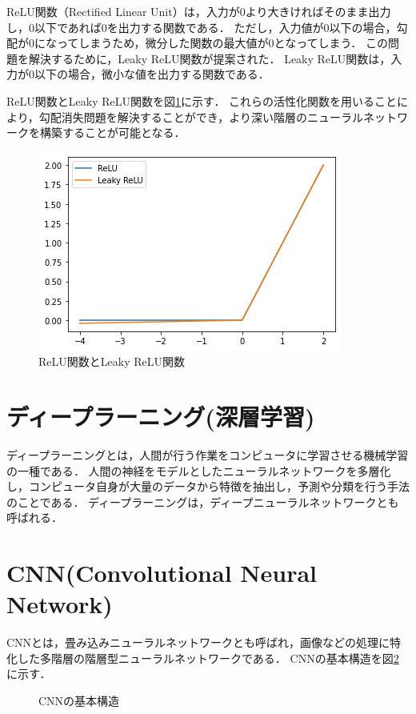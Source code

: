 \documentclass[a4j,12pt,dvipdfmx]{jreport}
\begin{document}
ReLU関数（Rectified Linear Unit）は，入力が0より大きければそのまま出力し，0以下であれば0を出力する関数である．
ただし，入力値が0以下の場合，勾配が0になってしまうため，微分した関数の最大値が0となってしまう．
この問題を解決するために，Leaky ReLU関数が提案された．
Leaky ReLU関数は，入力が0以下の場合，微小な値を出力する関数である．

ReLU関数とLeaky ReLU関数を図\ref{fig:relu}に示す．
これらの活性化関数を用いることにより，勾配消失問題を解決することができ，より深い階層のニューラルネットワークを構築することが可能となる．

\begin{figure}[b]
  \centering
  \includegraphics[width=10cm]{image/relu.png}
  \caption{ReLU関数とLeaky ReLU関数}
  \label{fig:relu}
\end{figure}

\section{ディープラーニング(深層学習)}
ディープラーニングとは，人間が行う作業をコンピュータに学習させる機械学習の一種である\cite{G}．
人間の神経をモデルとしたニューラルネットワークを多層化し，コンピュータ自身が大量のデータから特徴を抽出し，予測や分類を行う手法のことである．
ディープラーニングは，ディープニューラルネットワークとも呼ばれる．

\section{CNN(Convolutional Neural Network)}
CNNとは，畳み込みニューラルネットワークとも呼ばれ，画像などの処理に特化した多階層の階層型ニューラルネットワークである\cite{cnn}． 
CNNの基本構造を図\ref{fig:cnn}に示す．

\begin{figure}[b]
  \centering
  \caption{CNNの基本構造}
  \label{fig:cnn}
\end{figure}
\end{document}
